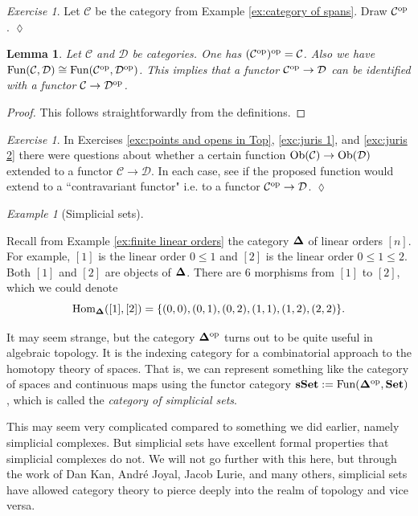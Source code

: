 \documentclass{book}
\def\tn{\textnormal}
\def\mc{\mathcal}
\def\Hom{\tn{Hom}}
\def\Fun{\tn{Fun}}
\def\Ob{\tn{Ob}}
\def\to{\rightarrow}
\def\iso{\cong}
\def\op{^\tn{op}}
\def\Set{{\bf Set}}
\def\sSet{{\bf sSet}}
\def\bD{{\bf \Delta}}
\def\mcC{\mc{C}}
\def\mcD{\mc{D}}
\newtheorem{lemma}[subsubsection]{Lemma}
\theoremstyle{remark}
\newtheorem{example}[subsubsection]{Example}
\newtheorem{exc}[subsubsection]{Exercise}
\newenvironment{exercise}{\begin{exc}}{\hspace*{\fill}$\lozenge$\end{exc}}
\theoremstyle{definition}
\begin{document}
\begin{exercise}
Let $\mcC$ be the category from Example \ref{ex:category of spans}. Draw $\mcC\op$.
\end{exercise}

\begin{lemma}

Let $\mcC$ and $\mcD$ be categories. One has $(\mcC\op)\op=\mcC$. Also we have $\Fun(\mcC,\mcD)\iso\Fun(\mcC\op,\mcD\op)$. This implies that a functor $\mcC\op\to\mcD$ can be identified with a functor $\mcC\to\mcD\op$.

\end{lemma}

\begin{proof}

This follows straightforwardly from the definitions.

\end{proof}

\begin{exercise}
In Exercises \ref{exc:points and opens in Top}, \ref{exc:juris 1}, and \ref{exc:juris 2} there were questions about whether a certain function $\Ob(\mcC)\to\Ob(\mcD)$ extended to a functor $\mcC\to\mcD$. In each case, see if the proposed function would extend to a ``contravariant functor" i.e. to a functor $\mcC\op\to\mcD$.
\end{exercise}

\begin{example}[Simplicial sets]\label{ex:simplicial set}

Recall from Example \ref{ex:finite linear orders} the category $\bD$ of linear orders $[n]$. For example, $[1]$ is the linear order $0\leq 1$ and $[2]$ is the linear order $0\leq 1\leq2$. Both $[1]$ and $[2]$ are objects of $\bD$.\index{a category!$\bD$} There are 6 morphisms from $[1]$ to $[2]$, which we could denote $$\Hom_{\bD}([1],[2])=\{(0,0), (0,1), (0,2), (1,1), (1,2), (2,2)\}.$$

It may seem strange, but the category $\bD\op$ turns out to be quite useful in algebraic topology. It is the indexing category for a combinatorial approach to the homotopy theory of spaces. That is, we can represent something like the category of spaces and continuous maps using the functor category $\sSet:=\Fun(\bD\op,\Set)$,\index{a category!$\sSet$} which is called the {\em category of simplicial sets}. 

This may seem very complicated compared to something we did earlier, namely simplicial complexes. But simplicial sets have excellent formal properties that simplicial complexes do not. We will not go further with this here, but through the work of Dan Kan, Andr\'{e} Joyal, Jacob Lurie, and many others, simplicial sets have allowed category theory to pierce deeply into the realm of topology and vice versa.

\end{example}
\end{document}
